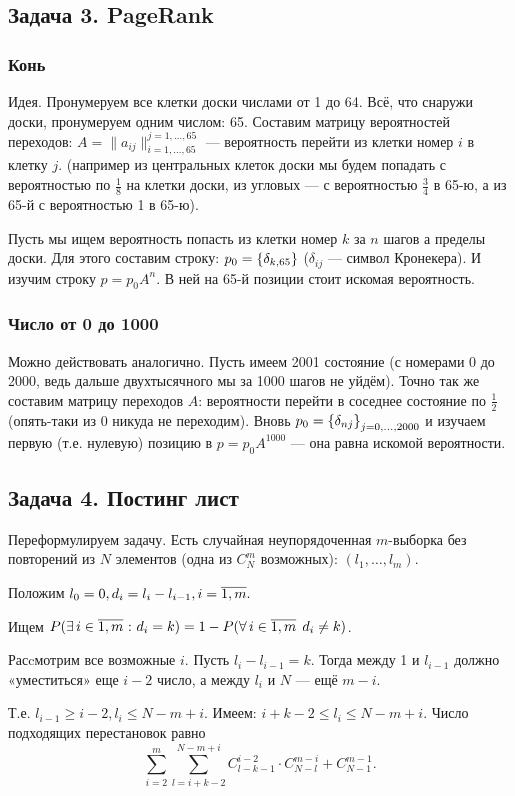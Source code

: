 \documentclass[12pt]{article}
\begin{document}
\subsection{Задача 3. PageRank}
\subsubsection{Конь}
Идея. Пронумеруем все клетки доски числами от 1 до 64. Всё, что снаружи доски, пронумеруем одним числом: 65. Составим матрицу вероятностей переходов: $A = \|a_{ij}\|_{i=1,\ldots,65}^{j=1,\ldots,65}$ --- вероятность перейти из клетки номер $i$ в клетку $j$. (например из центральных клеток доски мы будем попадать с вероятностью по $\frac18$ на клетки доски, из угловых --- с вероятностью $\frac34$ в 65-ю, а из 65-й с вероятностью 1 в 65-ю).

Пусть мы ищем вероятность попасть из клетки номер $k$ за $n$ шагов а пределы доски. Для этого составим строку: $p_0=\left\{\delta_{k,65}\right\}$ ($\delta_{ij}$ — символ Кронекера). И изучим строку $p = p_0A^n$. В ней на 65-й позиции стоит искомая вероятность.

\subsubsection{Число от 0 до 1000}
Можно действовать аналогично. Пусть имеем 2001 состояние (с номерами 0 до 2000, ведь дальше двухтысячного мы за 1000 шагов не уйдём). Точно так же составим матрицу переходов $A$: вероятности перейти в соседнее состояние по $\frac12$ (опять-таки из 0 никуда не переходим). Вновь $p_0=\left\{\delta_{nj}\right\}_{j=0,\ldots,2000}$ и изучаем первую (т.е. нулевую) позицию в $p = p_0A^{1000}$ — она равна искомой вероятности.

\subsection{Задача 4. Постинг лист}
Переформулируем задачу. Есть случайная неупорядоченная $m$-выборка без повторений из $N$ элементов (одна из $C_N^m$ возможных): $(l_1,\ldots,l_m)$. 

Положим $l_0 = 0, d_i = l_i - l_{i-1}, i=\overline{1,m}.$ 

Ищем $P(\exists\,i\in\overline{1,m}\:\colon d_i = k) = 1 - P(\forall\,i\in\overline{1,m}\:\:d_i \ne k) $.

Расcмотрим все возможные $i$. Пусть $l_i-l_{i-1} = k.$ Тогда между 1 и $l_{i-1}$ должно «уместиться» еще $i-2$ число, а между $l_i$ и $N$ — ещё $m-i$. 

Т.е. $l_{i-1} \ge i-2, l_i \le N - m + i$. Имеем: $i + k - 2 \le l_i \le N-m+i$.
Число подходящих перестановок равно 
$$\sum_{i=2}^m\sum_{l=i+k-2}^{N-m+i} C_{l-k-1}^{i-2}\cdot C_{N-l}^{m-i} + C_{N-1}^{m-1}.$$
\end{document}
